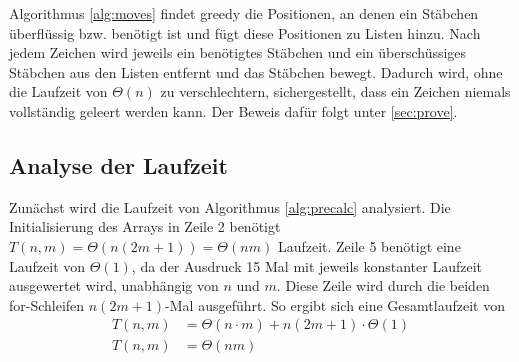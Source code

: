 \documentclass[a4paper,10pt,ngerman]{scrartcl}
\begin{document}
Algorithmus \ref{alg:moves} findet greedy die Positionen, an denen ein Stäbchen überflüssig bzw. benötigt ist und fügt diese Positionen zu Listen hinzu. Nach jedem Zeichen wird jeweils ein benötigtes Stäbchen und ein überschüssiges Stäbchen aus den Listen entfernt und das Stäbchen bewegt. Dadurch wird, ohne die Laufzeit von $\Theta(n)$ zu verschlechtern, sichergestellt, dass ein Zeichen niemals vollständig geleert werden kann. Der Beweis dafür folgt unter \ref{sec:prove}.

\subsection{Analyse der Laufzeit}
Zunächst wird die Laufzeit von Algorithmus \ref{alg:precalc} analysiert.
Die Initialisierung des Arrays in Zeile 2 benötigt $T(n, m) = \Theta(n (2m+1)) = \Theta(nm)$ Laufzeit.
Zeile 5 benötigt eine Laufzeit von $\Theta(1)$, da der Ausdruck 15 Mal mit jeweils konstanter Laufzeit ausgewertet wird, unabhängig von $n$ und $m$.
Diese Zeile wird durch die beiden for-Schleifen $n(2m+1)$-Mal ausgeführt. 
So ergibt sich eine Gesamtlaufzeit von 
\begin{align*}
    T(n, m) &= \Theta(n \cdot m) + n(2m+1) \cdot \Theta(1)\\
    T(n, m) &= \Theta(nm)
\end{align*}
\end{document}
